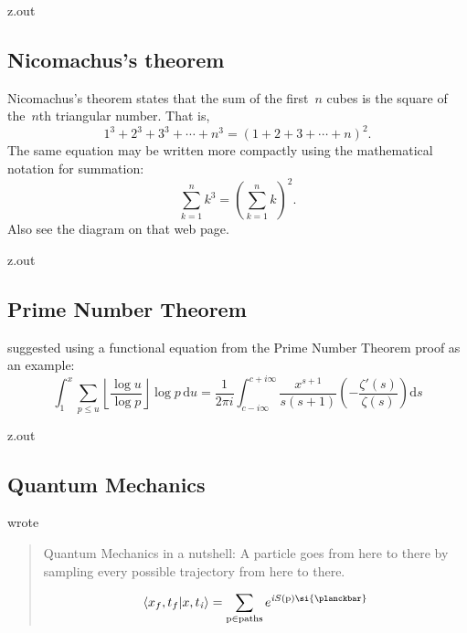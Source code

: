 \MyIO


\begin{VerbatimOut}{z.out}

\subsection{Nicomachus's theorem}

Nicomachus's theorem \cite{wikipedia-nicomachus} states that
the sum of the first~$n$ cubes is the square of the~$n$th triangular number.
That is,
\[
  1^3 + 2^3 + 3^3 + \cdots + n^3 = (1 + 2 + 3 + \cdots + n)^2.
\]
The same equation may be written more compactly using the mathematical notation for summation:
\[
  \sum_{k=1}^n k^3 = \left(\sum_{k=1}^n k\right)^2.
\]
Also see the diagram on that web page.
\end{VerbatimOut}

\MyIO


\begin{VerbatimOut}{z.out}

\subsection{Prime Number Theorem}

\textcite{li2013} suggested using a functional equation
from the Prime Number Theorem proof
as an example:
\begin{equation}
  \int_1^x
    \sum_{p\le u}
    \left\lfloor\frac{\log u}{\log p}\right\rfloor
    \log p
    \,\text{d}u
    =
    \frac1{2\pi i}
    \int_{c-i\infty}^{c+i\infty}
    \frac{x^{s+1}}{s(s+1)}
    \left(-\frac{\zeta'(s)}{\zeta(s)}\right)
    \text{d}s
\end{equation}
\end{VerbatimOut}

\MyIO


\begin{VerbatimOut}{z.out}

\subsection{Quantum Mechanics}

\textcite{greene-2021-04-04} wrote
\begin{quotation}
  Quantum Mechanics in a nutshell:
  A particle goes from here to there
  by sampling every possible trajectory from here to there.

  \[
    \langle x_f,t_f \vert x,t_{\mathit i} \rangle
    =
    \sum_{\text p \in \text{paths}} e^{\mathit iS(\text p) \si{\planckbar}}
  \]
\end{quotation}
\end{VerbatimOut}

